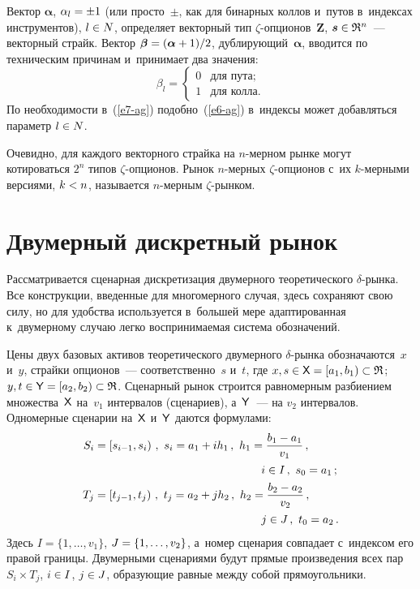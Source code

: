 \begin{multicols}{2}
  Вектор $\boldsymbol{\alpha}$, $\alpha_l \hm= \pm1$ (или просто~$\pm$, как для 
бинарных коллов и~путов в~индексах инструментов), $l \hm\in N$, определяет 
векторный тип $\zeta$-оп\-ци\-о\-нов~$\boldsymbol{Z}$, $\boldsymbol{s}\hm\in 
\mathfrak{R}^n$~--- векторный страйк. Вектор 
$\boldsymbol{\beta}\hm= (\boldsymbol{\alpha} \hm+ 1)/2$, дублирующий~$\boldsymbol{\alpha}$, 
вводится по техническим причинам и~принимает два значения: 
$$
\beta_l = \begin{cases}
0 & \mbox{для\ пута};\\
 1 & \mbox{для\ колла}.
 \end{cases}
 $$
 По необходимости в~(\ref{e7-ag}) 
подобно~(\ref{e6-ag}) в~индексы может добавляться параметр $l\hm\in N$. 
  
  Очевидно, для каждого векторного страйка на \mbox{$n$-мер}\-ном рынке могут 
котироваться $2^n$ типов \mbox{$\zeta$-оп}\-ци\-о\-нов. Рынок \mbox{$n$-мер}\-ных  
$\zeta$-оп\-ци\-о\-нов с~их \mbox{$k$-мер}\-ны\-ми версиями, $k\hm< n$, называется  
$n$-мер\-ным \mbox{$\zeta$-рын}\-ком. 
  
  \section{Двумерный дискретный рынок}
  
  Рассматривается сценарная дискретизация двумерного теоретического  
$\delta$-рын\-ка. Все конструкции, введенные для многомерного случая, здесь 
сохраняют свою силу, но для удобства используется в~большей мере 
адаптированная к~двумерному случаю легко воспринимаемая система 
обозначений. 
  
  Цены двух базовых активов теоретического двумерного $\delta$-рын\-ка 
обозначаются~$x$ и~$y$, страйки опционов~--- соответственно~$s$ и~$t$, где
$x, s \hm\in {\sf X}\hm = [a_1, b_1) \hm\subset\mathfrak{R}$; $y, t \hm\in{\sf 
Y}\hm = [a_2, b_2) \hm\subset\mathfrak{R}$. Сценарный рынок строится 
равномерным разбиением множества~${\sf X}$ на~$v_1$ интервалов 
(сценариев), а~${\sf Y}$~--- на $v_2$ интервалов. Одномерные сценарии 
на~${\sf X}$ и~${\sf Y}$ даются фор\-му\-лами: 
  \begin{align*}
S_i&=\left[ s_{i-1},s_i\right)\,,\ s_i=a_1+ih_1\,,\ h_1=\fr{b_1-a_1}{v_1}\,,\\
  & \hspace*{52mm}i\in I\,,\  s_0=a_1\,;\\
T_j&=\left[ t_{j-1}, t_j\right)\,,\ t_j=a_2+jh_2\,,\ h_2= \fr{b_2-a_2}{v_2}\,,\\
  & \hspace*{52mm}j\in J\,,\  t_0=a_2\,.
  \end{align*}
  Здесь $I = \{1,\ldots ,v_1\}$, $J \hm= \{1,\ldots ,v_2\}$, а~номер сценария 
совпадает с~индексом его правой границы. Двумерными сценариями будут 
прямые произведения всех пар $S_i\times T_j$, $i \hm\in I$, $j \hm\in J$, 
образующие равные между собой прямоугольники. 
  

\end{multicols}
